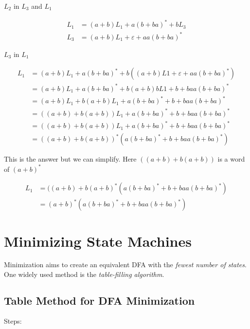 \(L_2\) in \(L_3\) and \(L_1\) 

\begin{align*}
    L_1 &= (a+b)L_1 + a(b + ba)^* +bL_3\\
    L_3 &= (a+b)L_1 + \varepsilon + aa(b + ba)^* 
\end{align*}

\(L_3\) in  \(L_1\)

\begin{align*}
    L_1 &= (a+b)L_1 + a(b + ba)^* +b((a+b)L1 + \varepsilon + aa(b + ba)^*)\\
        &= (a+b)L_1 + a(b + ba)^* +b(a+b)bL1 + b + baa(b + ba)^*\\
        &= (a+b)L_1  + b(a+b)L_1 + a(b + ba)^* + b + baa(b + ba)^*\\
        &= ((a+b)  + b(a+b))L_1 + a(b + ba)^* + b + baa(b + ba)^*\\
        &= ((a+b)  + b(a+b))L_1 + a(b + ba)^* + b + baa(b + ba)^*\\
        &= ((a+b)  + b(a+b))^*(a(b + ba)^* + b + baa(b + ba)^*)
\end{align*}

This is the answer but we can simplify. Here \(((a+ b) + b(a+b))\) is a word of \((a+b)^*\)

\begin{align*}
    L_1 &= ((a+b)  + b(a + b)^*(a(b + ba)^* + b + baa(b + ba)^*) \\
        &= (a+b)^* (a(b + ba)^* + b + baa(b + ba)^*)
\end{align*}

\section{Minimizing State Machines}

Minimization aims to create an equivalent DFA with the \emph{fewest number of states}. One widely used 
method is the \emph{table-filling algorithm}.

\subsection{Table Method for DFA Minimization}

Steps:


